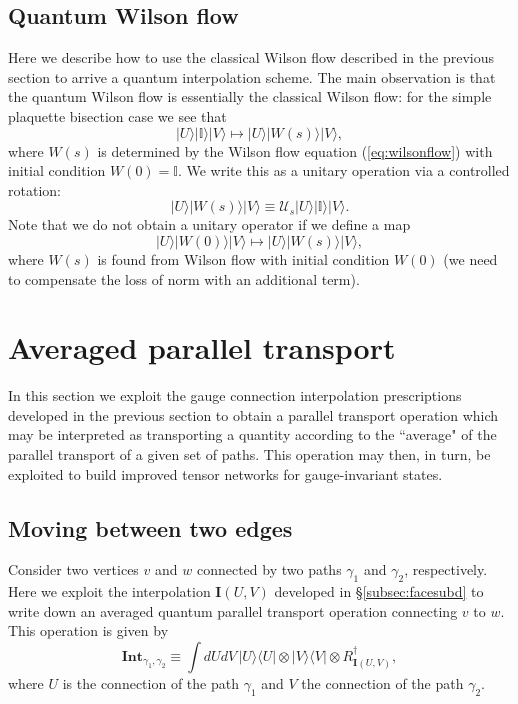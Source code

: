 \documentclass[12pt]{amsart}
\def\CAv{\mathbf{Int}}
\theoremstyle{definition}
\theoremstyle{remark}
\numberwithin{equation}{section}
\begin{document}
\subsection{Quantum Wilson flow}
Here we describe how to use the classical Wilson flow described in the previous section to arrive a quantum interpolation scheme. The main observation is that the quantum Wilson flow is essentially the classical Wilson flow: for the simple plaquette bisection case we see that
\begin{equation}
	|U\rangle |\mathbb{I}\rangle |V\rangle \mapsto |U\rangle |W(s)\rangle |V\rangle,
\end{equation}
where $W(s)$ is determined by the Wilson flow equation (\ref{eq:wilsonflow}) with initial condition $W(0) = \mathbb{I}$. We write this as a unitary operation via a controlled rotation:
\begin{equation}
	|U\rangle |W(s)\rangle |V\rangle \equiv \mathcal{U}_s |U\rangle |\mathbb{I}\rangle |V\rangle.
\end{equation}
Note that we do not obtain a unitary operator if we define a map 
\begin{equation}
	|U\rangle |W(0)\rangle |V\rangle \mapsto |U\rangle |W(s)\rangle |V\rangle,
\end{equation}
where $W(s)$ is found from Wilson flow with initial condition $W(0)$ (we need to compensate the loss of norm with an additional term).

\section{Averaged parallel transport}
In this section we exploit the gauge connection interpolation prescriptions developed in the previous section to obtain a parallel transport operation which may be interpreted as transporting a quantity according to the ``average" of the parallel transport of a given set of paths. This operation may then, in turn, be exploited to build improved tensor networks for gauge-invariant states.

\subsection{Moving between two edges}

Consider two vertices $v$ and $w$ connected by two paths $\gamma_1$ and $\gamma_2$, respectively. Here we exploit the interpolation $\mathbf{I}(U,V)$ developed in \S\ref{subsec:facesubd} to write down an averaged quantum parallel transport operation connecting $v$ to $w$. This operation is given by
\begin{equation}
	\CAv_{\gamma_1,\gamma_2} \equiv \int dUdV \, |U\rangle\langle U|\otimes |V\rangle\langle V| \otimes R_{\mathbf{I}(U,V)}^\dag,
\end{equation}
where $U$ is the connection of the path $\gamma_1$ and $V$ the connection of the path $\gamma_2$.
\end{document}
